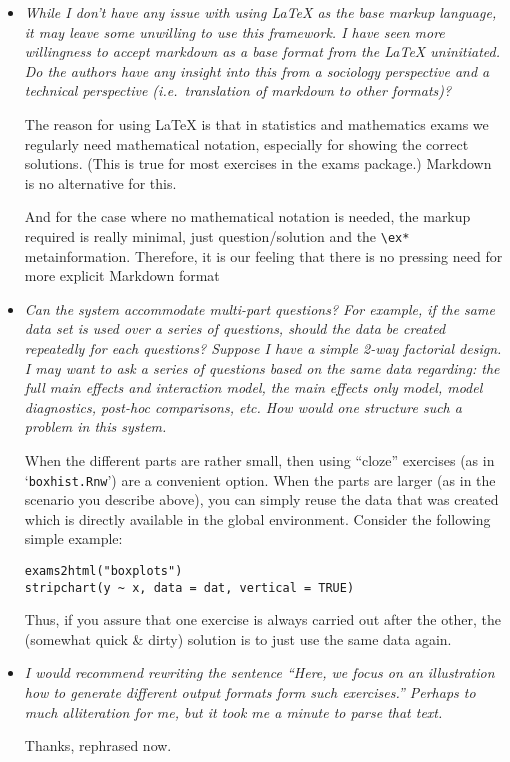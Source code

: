 \documentclass[a4paper]{article}
\begin{document}
\begin{itemize}
But maybe, Fritz, you have a better suggestion based on your experiences at Boku?

F: I currently don't need more tags beyond what we have in
\verb|read_metainfo|, and certainly not answernumbering. But \verb|\exextra| could
make a lot of sense, because one could very quickly use an extra
option for a particular driver $\rightarrow$ on 2do list for future versions?
Implement without using seems silly to me.


\item {\it
While I don't have any issue with using {\LaTeX} as the base markup
language, it may leave some unwilling to use this framework. I have seen
more willingness to accept markdown as a base format from the {\LaTeX}
uninitiated. Do the authors have any insight into this from a sociology
perspective and a technical perspective (i.e.\ translation of markdown to
other formats)?}

The reason for using {\LaTeX} is that in statistics and mathematics exams we
regularly need mathematical notation, especially for showing the correct
solutions. (This is true for most exercises in the exams package.)
Markdown is no alternative for this.

And for the case where no mathematical notation is needed, the markup
required is really minimal, just {question}/{solution} and the \verb|\ex*|
metainformation. Therefore, it is our feeling that there is no pressing
need for more explicit Markdown format

\item {\it
Can the system accommodate multi-part questions? For example, if the
same data set is used over a series of questions, should the data be
created repeatedly for each questions? Suppose I have a simple 2-way
factorial design. I may want to ask a series of questions based on the
same data regarding: the full main effects and interaction model, the main
effects only model, model diagnostics, post-hoc comparisons, etc. How
would one structure such a problem in this system.}

When the different parts are rather small, then using ``cloze'' exercises
(as in `\texttt{boxhist.Rnw}') are a convenient option. When the parts are larger
(as in the scenario you describe above), you can simply reuse the data
that was created which is directly available in the global environment.
Consider the following simple example:
\begin{verbatim}
exams2html("boxplots")
stripchart(y ~ x, data = dat, vertical = TRUE)
\end{verbatim}
Thus, if you assure that one exercise is always carried out after the
other, the (somewhat quick \& dirty) solution is to just use the same
data again.

\item {\it
I would recommend rewriting the sentence ``Here, we focus on an
illustration how to generate different output formats form such
exercises.'' Perhaps to much alliteration for me, but it took me a minute
to parse that text.}

Thanks, rephrased now.

\end{itemize}
\end{document}
